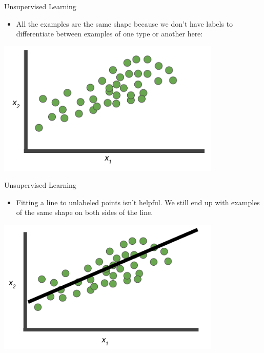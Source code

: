 \documentclass{beamer}
\begin{document}
\begin{frame}{Unsupervised Learning}

\begin{itemize}
\item All the examples are the same shape because we don't have labels to differentiate between examples of one type or another here:
\end{itemize}

\medskip

\includegraphics[width=0.8\textwidth]{images/Graph4.png}

\end{frame}


\begin{frame}{Unsupervised Learning}

\begin{itemize}
\item Fitting a line to unlabeled points isn't helpful. We still end up with examples of the same shape on both sides of the line. 
\end{itemize}

\includegraphics[width=0.8\textwidth]{images/Graph5.png}

\end{frame}
\end{document}
